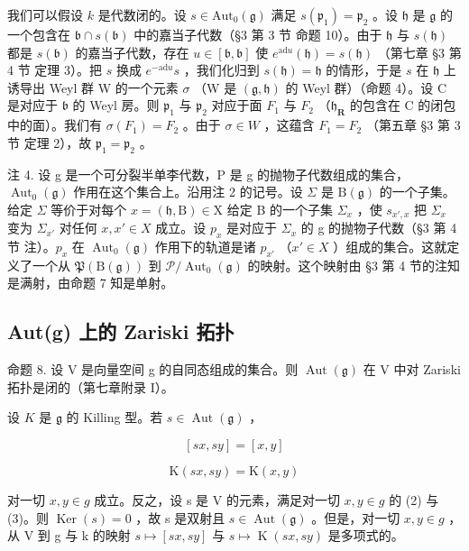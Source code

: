 我们可以假设 \(k\) 是代数闭的。设 \(s \in \mathrm{Aut}_0(\mathfrak{g})\) 满足 \(s(\mathfrak{p}_1) = \mathfrak{p}_2\) 。设 \(\mathfrak{h}\) 是 \(\mathfrak{g}\) 的一个包含在 \(\mathfrak{b} \cap s(\mathfrak{b})\) 中的嘉当子代数（§3 第 3 节 命题 10）。由于 \(\mathfrak{h}\) 与 \(s(\mathfrak{h})\) 都是 \(s(\mathfrak{b})\) 的嘉当子代数，存在 \(u \in [\mathfrak{b}, \mathfrak{b}]\) 使 \(e^{\mathrm{ad}u}(\mathfrak{h}) = s(\mathfrak{h})\) （第七章 §3 第 4 节 定理 3）。把 \(s\) 换成 \(e^{-\mathrm{ad}u}s\) ，我们化归到 \(s(\mathfrak{h}) = \mathfrak{h}\) 的情形，于是 \(s\) 在 \(\mathfrak{h}\) 上诱导出 Weyl 群 W 的一个元素 \(\sigma\) （W 是 \((\mathfrak{g}, \mathfrak{h})\) 的 Weyl 群）（命题 4）。设 C 是对应于 \(\mathfrak{b}\) 的 Weyl 房。则 \(\mathfrak{p}_1\) 与 \(\mathfrak{p}_2\) 对应于面 \(F_1\) 与 \(F_2\) （\(\mathfrak{h}_{\mathbf{R}}\) 的包含在 C 的闭包中的面）。我们有 \(\sigma(F_1) = F_2\) 。由于 \(\sigma \in W\) ，这蕴含 \(F_1 = F_2\) （第五章 §3 第 3 节 定理 2），故 \(\mathfrak{p}_1 = \mathfrak{p}_2\) 。

注 4. 设 g 是一个可分裂半单李代数，P 是 g 的抛物子代数组成的集合，\(\operatorname{Aut}_{0}(\mathfrak{g})\) 作用在这个集合上。沿用注 2 的记号。设 \(\Sigma\) 是 \(\mathrm{B}(\mathfrak{g})\) 的一个子集。给定 \(\Sigma\) 等价于对每个 \(x = (\mathfrak{h}, \mathrm{B}) \in \mathrm{X}\) 给定 B 的一个子集 \(\Sigma_{x}\) ，使 \(s_{x',x}\) 把 \(\Sigma_{x}\) 变为 \(\Sigma_{x'}\) 对任何 \(x, x' \in X\) 成立。设 \(p_{x}\) 是对应于 \(\Sigma_{x}\) 的 g 的抛物子代数（§3 第 4 节 注）。\(p_{x}\) 在 \(\operatorname{Aut}_{0}(\mathfrak{g})\) 作用下的轨道是诸 \(p_{x'}\) （\(x' \in X\) ）组成的集合。这就定义了一个从 \(\mathfrak{P}(\mathrm{B}(\mathfrak{g}))\) 到 \(\mathcal{P}/\operatorname{Aut}_{0}(\mathfrak{g})\) 的映射。这个映射由 §3 第 4 节的注知是满射，由命题 7 知是单射。

\subsection{Aut(g) 上的 Zariski 拓扑}

命题 8. 设 V 是向量空间 g 的自同态组成的集合。则 \(\operatorname{Aut}(\mathfrak{g})\) 在 V 中对 Zariski 拓扑是闭的（第七章附录 I）。

设 \(K\) 是 \(\mathfrak{g}\) 的 Killing 型。若 \(s \in \operatorname{Aut}(\mathfrak{g})\) ，

\[
  [ s x, s y ] = [ x, y ]\tag{2}
\]

\[
\mathrm{K} (s x, s y) = \mathrm{K} (x, y)\tag{3}
\]

对一切 \(x, y \in g\) 成立。反之，设 s 是 V 的元素，满足对一切 \(x, y \in g\) 的 (2) 与 (3)。则 \(\operatorname{Ker}(s) = 0\) ，故 s 是双射且 \(s \in \operatorname{Aut}(\mathfrak{g})\) 。但是，对一切 \(x, y \in g\) ，从 V 到 g 与 k 的映射 \(s \mapsto [sx, sy]\) 与 \(s \mapsto \operatorname{K}(sx, sy)\) 是多项式的。

